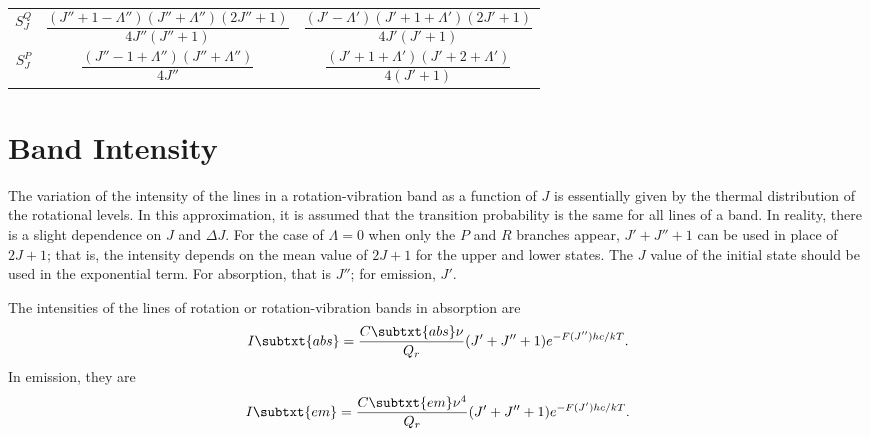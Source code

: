 \begin{table}[H]
\begin{tabular}{ccc}
        \addlinespace[0.5em]
        $S_J^Q$ & $\dfrac{(J'' + 1 - \Lambda'')(J'' + \Lambda'')(2J'' + 1)}{4J''(J'' + 1)}$ & $\dfrac{(J' - \Lambda')(J' + 1 + \Lambda')(2J' + 1)}{4J'(J' + 1)}$ \\
        \addlinespace[0.5em]
        $S_J^P$ & $\dfrac{(J'' - 1 + \Lambda'')(J'' + \Lambda'')}{4J''}$                    & $\dfrac{(J' + 1 + \Lambda')(J' + 2 + \Lambda')}{4(J' + 1)}$        \\
        \bottomrule
    \end{tabular}
\end{table}

\section{Band Intensity}
\label{s:band_intensity}

The variation of the intensity of the lines in a rotation-vibration band as a function of $J$ is essentially given by the thermal distribution of the rotational levels. In this approximation, it is assumed that the transition probability is the same for all lines of a band. In reality, there is a slight dependence on $J$ and $\Delta{}J$. For the case of $\Lambda = 0$ when only the $P$ and $R$ branches appear, $J' + J'' + 1$ can be used in place of $2J + 1$; that is, the intensity depends on the mean value of $2J + 1$ for the upper and lower states. The $J$ value of the initial state should be used in the exponential term. For absorption, that is $J''$; for emission, $J'$.

The intensities of the lines of rotation or rotation-vibration bands in absorption are
\begin{equation}
    I\subtxt{abs} = \frac{C\subtxt{abs}\nu}{Q_r}(J' + J'' + 1)e^{-F(J'')hc/kT}.
\end{equation}
In emission, they are
\begin{equation}
    I\subtxt{em} = \frac{C\subtxt{em}\nu^4}{Q_r}(J' + J'' + 1)e^{-F(J')hc/kT}.
\end{equation}

